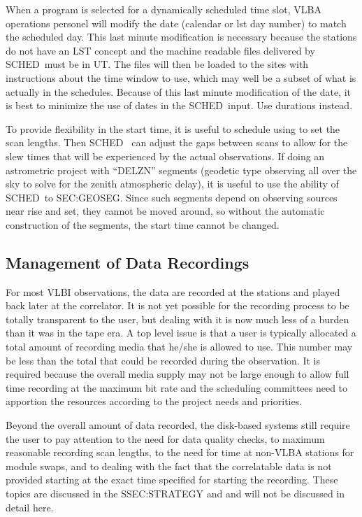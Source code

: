 \documentclass{report}
\newcommand{\schedb}{{\sc SCHED~}}
\begin{document}
When a program is selected for a dynamically scheduled time slot,
VLBA operations personel will modify the date (calendar or lst day
number) to match the scheduled day.  This last minute modification
is necessary because the stations do not have an LST concept and
the machine readable files delivered by \schedb must be in UT.
The files will then be loaded to the sites with instructions about
the time window to use, which may well be a subset of what is
actually in the schedules.  Because of this last minute modification
of the date, it is best to minimize the use of dates in the
\schedb input.  Use durations instead.

To provide flexibility in the start time, it is useful to schedule
using  to set the scan lengths.  Then \schedb
can adjust the gaps between scans to allow for the slew times that
will be experienced by the actual observations.  If doing an
astrometric project with ``DELZN'' segments (geodetic type observing
all over the sky to solve for the zenith atmospheric delay), it is
useful to use the ability of \schedb to  {SEC:GEOSEG}.  Since such segments depend on
observing sources near rise and set, they cannot be moved around, so
without the automatic construction of the segments, the start time
cannot be changed.


\subsection{\label{SSEC:RECMANAGEMENT}Management of Data Recordings}

For most VLBI observations, the data are recorded at the stations and
played back later at the correlator.  It is not yet possible for the
recording process to be totally transparent to the user, but dealing
with it is now much less of a burden than it was in the tape era.
A top level issue is that a user is typically allocated a total amount
of recording media that he/she is allowed to use.  This number may
be less than the total that could be recorded during the observation.
It is required because the overall media supply may not be large
enough to allow full time recording at the maximum bit rate and the
scheduling committees need to apportion the resources according to
the project needs and priorities.

Beyond the overall amount of data recorded, the disk-based systems
still require the user to pay attention to the need for data quality
checks, to maximum reasonable recording scan lengths, to the need for
time at non-VLBA stations for module swaps, and to dealing with the
fact that the correlatable data is not provided starting at the exact
time specified for starting the recording.  These topics are discussed
in the  {SSEC:STRATEGY} and  and will not be discussed in detail
here.
\end{document}
